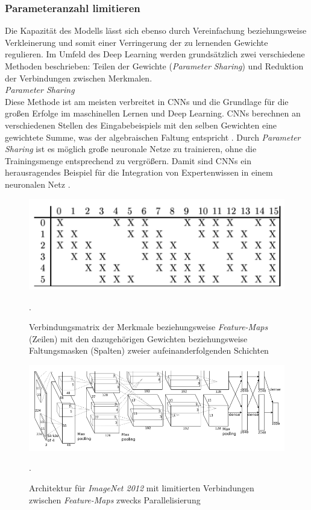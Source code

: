 \subsubsection{Parameteranzahl limitieren}
Die Kapazität des Modells lässt sich ebenso durch Vereinfachung beziehungsweise Verkleinerung und somit einer Verringerung der zu lernenden Gewichte regulieren. Im Umfeld des Deep Learning werden grundsätzlich zwei verschiedene Methoden beschrieben: Teilen der Gewichte (\textit{Parameter Sharing}) und Reduktion der Verbindungen zwischen Merkmalen. \\

\textit{Parameter Sharing} \\
Diese Methode ist am meisten verbreitet in CNNs und die Grundlage für die großen Erfolge im maschinellen Lernen und Deep Learning. CNNs berechnen an verschiedenen Stellen des Eingabebeispiels mit den selben Gewichten eine gewichtete Summe, was der algebraischen Faltung entspricht \cite[vgl.][]{LeCun1998}. 
Durch \textit{Parameter Sharing} ist es möglich große neuronale Netze zu trainieren, ohne die Trainingsmenge entsprechend zu vergrößern. Damit sind CNNs ein herausragendes Beispiel für die Integration von Expertenwissen in einem neuronalen Netz \cite[vgl.][Kap 7.8, S. 224]{Bengio2015}. \\

\begin{figure}
\centering
\includegraphics[width=0.4\linewidth]{images/4_connections}
\caption[]{Verbindungsmatrix der Merkmale beziehungsweise \textit{Feature-Maps} (Zeilen) mit den dazugehörigen Gewichten beziehungsweise Faltungsmasken (Spalten) zweier aufeinanderfolgenden Schichten \cite[siehe][]{LeCun1998}}.
\label{fig:4_connections}
\end{figure}

\begin{figure}
\centering
\includegraphics[width=0.9\linewidth]{images/4_Kriz}
\caption[]{Architektur für \textit{ImageNet 2012} mit limitierten Verbindungen zwischen \textit{Feature-Maps} zwecks Parallelisierung  \cite[siehe][]{Krizhevsky2012}}.
\label{fig:4_Kriz}
\end{figure}

